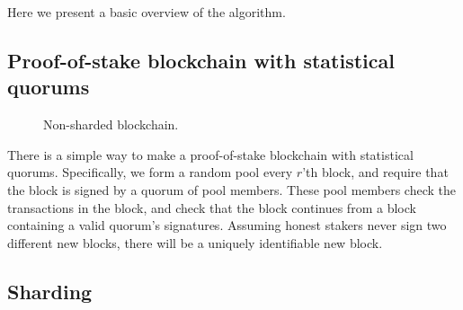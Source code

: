 \documentclass{article}
\begin{document}
Here we present a basic overview of the algorithm.


\subsection{Proof-of-stake blockchain with statistical quorums}


\begin{figure}
  \centering
  \caption{Non-sharded blockchain.}
\end{figure}

There is a simple way to make a proof-of-stake blockchain with statistical
quorums.  Specifically, we form a random pool every $r$'th block, and require
that the block is signed by a quorum of pool members.  These pool members check
the transactions in the block, and check that the block continues from a block
containing a valid quorum's signatures.  Assuming honest stakers never sign two
different new blocks, there will be a uniquely identifiable new block.

\subsection{Sharding}
\end{document}
